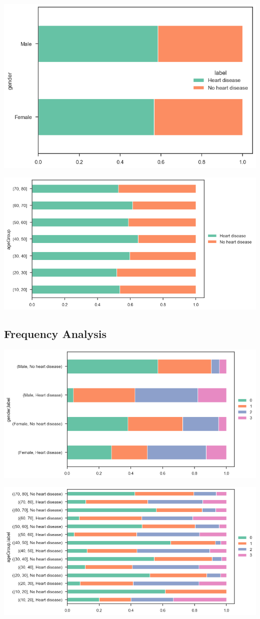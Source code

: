 \includegraphics[width=0.8\linewidth]{media/demographics-04-gender-target-percentage.png}

\includegraphics[width=0.8\linewidth]{media/demographics-05-agegroup-target-percentage.png}

\subsection{Frequency Analysis}

\includegraphics[width=0.8\linewidth]{media/frequency-01-gender-vessels.png}

\includegraphics[width=0.8\linewidth]{media/frequency-02-agegroup-vessels.png}

